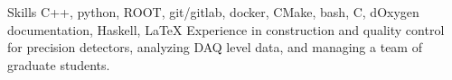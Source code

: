 
\begin{rubric}{Skills}
	C++, python, ROOT, git/gitlab, docker, CMake, bash, C, dOxygen documentation, Haskell, \LaTeX
\entry*[Instrumentation]
	Experience in construction and quality control for precision detectors, analyzing DAQ level data, and managing a team of graduate students.
\end{rubric}

